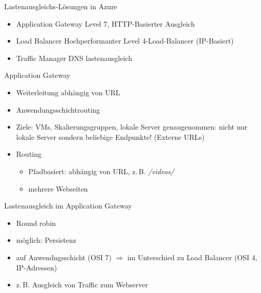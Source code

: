 
\begin{flashcard}[Definition]{Lastenausgleichs-Lösungen in Azure}
    \begin{itemize}
        \item Application Gateway\newline
            Level 7, HTTP-Basierter Ausgleich
        \item Load Balancer\newline
            Hochperformanter Level 4-Load-Balancer (IP-Basiert)
        \item Traffic Manager\newline
            DNS lastenausgleich
    \end{itemize}
\end{flashcard}   


\begin{flashcard}[Definition]{Application Gateway}
    \begin{itemize}
        \item Weiterleitung abhängig von URL
        \item Anwendungsschichtrouting
        \item Ziele: VMs, Skalierungsgruppen, lokale Server\newline
            genaugenommen: nicht nur lokale Server sondern beliebige Endpunkte! (Externe URLs)
        \item Routing
            \begin{itemize}
                \item Pfadbasiert:\newline
                    abhängig von URL, z.\,B. \emph{/videos/}
                \item mehrere Webseiten
            \end{itemize}

    \end{itemize}
\end{flashcard}   

\begin{flashcard}[Definition]{Lastenausgleich im Application Gateway}
    \begin{itemize}
        \item Round robin
        \item möglich: Persistenz
        \item auf Anwendngsschicht (OSI 7)\newline
            $\Rightarrow$ im Unterschied zu Load Balancer (OSI 4, IP-Adressen)
        \item z.\,B. Ausgleich von Traffic zum Webserver
    \end{itemize}
\end{flashcard}

